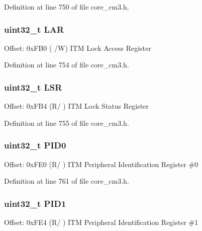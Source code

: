 Definition at line 750 of file core\+\_\+cm3.\+h.

\subsubsection[{\texorpdfstring{L\+AR}{LAR}}]{ uint32\+\_\+t L\+AR}\hypertarget{struct_i_t_m___type_acc9e51f871c357a9094105435b150d13}{}\label{struct_i_t_m___type_acc9e51f871c357a9094105435b150d13}
Offset\+: 0x\+F\+B0 ( /W) I\+TM Lock Access Register 

Definition at line 754 of file core\+\_\+cm3.\+h.

\subsubsection[{\texorpdfstring{L\+SR}{LSR}}]{ uint32\+\_\+t L\+SR}\hypertarget{struct_i_t_m___type_a7219432d03f6cd1d220f4fe10aef4880}{}\label{struct_i_t_m___type_a7219432d03f6cd1d220f4fe10aef4880}
Offset\+: 0x\+F\+B4 (R/ ) I\+TM Lock Status Register 

Definition at line 755 of file core\+\_\+cm3.\+h.

\subsubsection[{\texorpdfstring{P\+I\+D0}{PID0}}]{ uint32\+\_\+t P\+I\+D0}\hypertarget{struct_i_t_m___type_a6e3343cc3c4a8a5a6f14937882e9202a}{}\label{struct_i_t_m___type_a6e3343cc3c4a8a5a6f14937882e9202a}
Offset\+: 0x\+F\+E0 (R/ ) I\+TM Peripheral Identification Register \#0 

Definition at line 761 of file core\+\_\+cm3.\+h.

\subsubsection[{\texorpdfstring{P\+I\+D1}{PID1}}]{ uint32\+\_\+t P\+I\+D1}\hypertarget{struct_i_t_m___type_afa06959344f4991b00e6c545dd2fa30b}{}\label{struct_i_t_m___type_afa06959344f4991b00e6c545dd2fa30b}
Offset\+: 0x\+F\+E4 (R/ ) I\+TM Peripheral Identification Register \#1 

